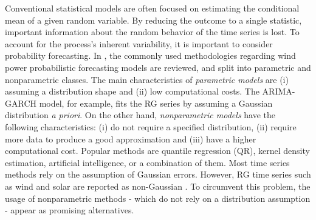 
Conventional statistical models are often focused on estimating the conditional mean of a given random variable. %
By reducing the outcome to a single statistic, important information about the  random behavior of the time series is lost. To account for the process's inherent variability, it is important to consider probability forecasting.
In \cite{zhang_review_2014}, the commonly used methodologies regarding wind power probabilistic forecasting models are reviewed, and split into parametric and nonparametric classes. The main characteristics of \emph{parametric models} are (i) assuming a distribution shape and (ii) low computational costs. The ARIMA-GARCH model, for example, fits the RG series by assuming a Gaussian distribution \emph{a priori}. On the other hand, \emph{nonparametric models} have the following characteristics: (i) do not require a specified distribution, (ii) require more data to produce a good approximation and (iii) have a higher computational cost. Popular methods are quantile regression (QR), kernel density estimation,  artificial intelligence, or a combination of them.
Most time series methods rely on the assumption of Gaussian errors. However, RG time series such as wind and solar are reported as non-Gaussian \cite{bessa2012time,jeon2012using,taylor2015forecasting,Wan2017}. To circumvent this problem, the usage of nonparametric methods - which do not rely on a distribution assumption - appear as promising alternatives. 

